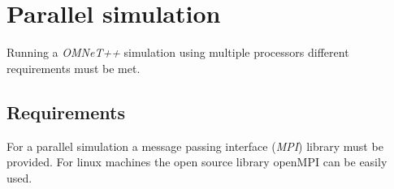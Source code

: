 \chapter{Parallel simulation}
\label{cha:parallel_sim}

Running a \emph{OMNeT++} simulation using multiple processors different requirements must be met.

\section{Requirements}
\label{sec:parallel_sim_requriements}

For a parallel simulation a message passing interface (\emph{MPI}) library must be provided.
For linux machines the open source library openMPI can be easily used.
